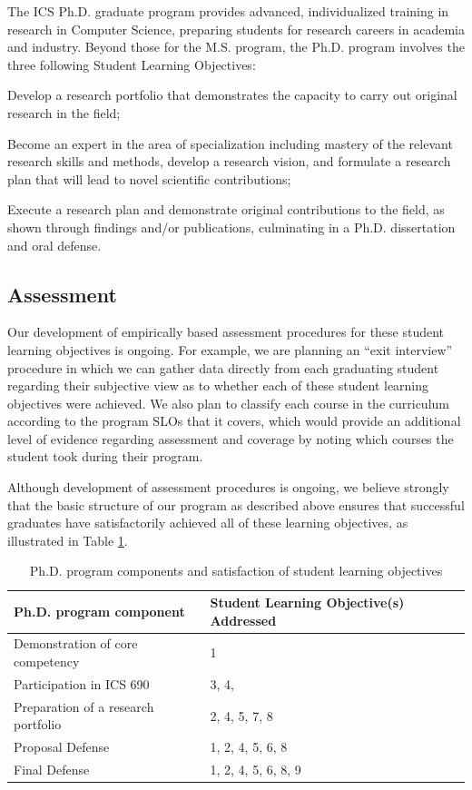 \documentclass[12pt]{article}
\begin{document}
The ICS Ph.D. graduate program provides advanced, individualized training in research 
in Computer Science, preparing students for research careers in academia and industry.  
Beyond  those for the M.S. program, the Ph.D. program involves the three following 
Student Learning Objectives:

\begin{list}{.}{ \setcounter{listcounter}{6}}
\item Develop a research portfolio that demonstrates the capacity to carry out original 
research in the field;
\item Become an expert in the area of specialization including mastery of the relevant 
research skills and methods, develop a research vision, and formulate a research plan 
that will lead to novel scientiﬁc contributions;
\item Execute a research plan and demonstrate original contributions to the field, as 
shown through findings and/or publications, culminating in a Ph.D. dissertation and oral 
defense.
\end{list}

\subsection{Assessment}

Our development of empirically based assessment procedures for these student learning
objectives is ongoing.  For example, we are planning an ``exit interview'' procedure in which we can gather data
directly from each graduating student regarding their subjective view as to
whether each of these student learning objectives were achieved. We also
plan to classify each course in the curriculum according to the program
SLOs that it covers, which would provide an additional level of evidence
regarding assessment and coverage by noting which courses the student took
during their program. 

Although development of assessment procedures is ongoing, we believe
strongly that the basic structure of our program as described above ensures
that successful graduates have satisfactorily achieved all of these
learning objectives, as illustrated in Table \ref{phd.slos}.

\begin{table}[htbp]
\begin{center}
\caption{Ph.D. program components and satisfaction of student learning
  objectives}
\label{phd.slos}
\begin{tabular}{|l|l|} \hline
{\bf Ph.D. program component} & {\bf Student Learning Objective(s) Addressed}  \\ \hline
Demonstration of core competency & 1 \\
Participation in ICS 690 & 3, 4,  \\
Preparation of a research portfolio & 2, 4, 5, 7, 8 \\
Proposal Defense & 1, 2, 4, 5, 6, 8 \\
Final Defense & 1, 2, 4, 5, 6, 8, 9 \\ \hline
\end{tabular}
\end{center}
\end{table}
\end{document}
